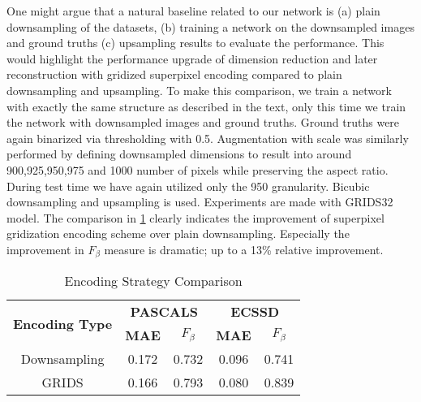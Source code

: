 \documentclass[a4paper,conference]{IEEEtran}
\begin{document}
One might argue that a natural baseline related to our network is (a) plain downsampling of the datasets, (b) training a network on the downsampled images and ground truths (c) upsampling results to evaluate the performance. This would highlight the performance upgrade of dimension reduction and later reconstruction with gridized superpixel encoding compared to plain downsampling and upsampling. To make this comparison, we train a network with exactly the same structure as described in the text, only this time we train the network with downsampled images and ground truths. Ground truths were again binarized via thresholding with 0.5. Augmentation with scale was similarly performed by defining downsampled dimensions to result into around 900,925,950,975 and 1000 number of pixels while preserving the aspect ratio. During test time we have again utilized only the 950 granularity. Bicubic downsampling and upsampling is used. Experiments are made with GRIDS32 model. The comparison in \ref{table5} clearly indicates the improvement of superpixel gridization encoding scheme over plain downsampling. Especially the improvement in $F_\beta$ measure is dramatic; up to a 13\% relative improvement.



\begin{table}[!t]
\renewcommand{\arraystretch}{1.3}
\caption{Encoding Strategy Comparison}
\label{table5}
\centering
\begin{tabular}{|c||c||c||c||c|}
\hline
    \multirow{2}{2cm}{\textbf{Encoding Type}} & \multicolumn{2}{c|}{\textbf{PASCALS}} & \multicolumn{2}{c|}{\textbf{ECSSD}}   \\
    \cline{2-5}
     &\textbf{MAE} & \textbf{$F_\beta$} & \textbf{MAE} & \textbf{$F_\beta$}   \\
    \hline

    Downsampling & 0.172 & 0.732 & 0.096 & 0.741   \\ \hline
    GRIDS & 0.166 & 0.793 & 0.080 & 0.839 \\ \hline

\end{tabular}
\end{table}
\end{document}
